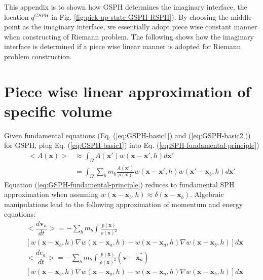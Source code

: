  \label{app:determine-imag-int} 
This appendix is to shown how GSPH determines the imaginary interface, the location $q^{GSPH}$ in Fig. \ref{fig:pick-up-state-GSPH-RSPH}). By choosing the middle point as the imaginary interface, we essentially adopt piece wise constant manner when constructing of Riemann problem. The following shows how the imaginary interface is determined if a piece wise linear manner is adopted for Riemann problem construction.

\section{Piece wise linear approximation of specific volume}
Given fundamental equations (Eq. (\ref{eq:GSPH-basic1}) and (\ref{eq:GSPH-basic2})) for GSPH, plug Eq. (\ref{eq:GSPH-basic1}) into Eq. (\ref{eq:SPH-fundamental-principle})
\begin{equation}
\begin{split}
<A\left(\textbf{x}\right)> 
& \approx \int_{\Omega} A\left(\textbf{x} \prime\right) w\left(\textbf{x}-\textbf{x}\prime, h\right) d\textbf{x}\prime \\
& = \int_{\Omega}  \sum_{b} m_{b} \frac{A\left(\textbf{x} \prime\right)}{\rho(\textbf{x})} w\left(\textbf{x}-\textbf{x}\prime, h\right) w(\textbf{x}\prime - \textbf{x}_{b}, h) d\textbf{x}\prime
\end{split}
\label{eq:GSPH-fundamental-principle}
\end{equation}
Equation (\ref{eq:GSPH-fundamental-principle}) reduces to fundamental SPH approximation when assuming $w(\textbf{x} - \textbf{x}_{b}, h) \approx \delta (\textbf{x} - \textbf{x}_{b})$. 
Algebraic manipulations \citep{inutsuka2002reformulation,iwasaki2011smoothed} lead to the following approximation of momentum and energy equations:
\begin{equation}
\begin{split}
&<\dfrac{d \textbf{v}_{a}}{dt}> =-\sum_{b} m_{b} \int \frac{p(\textbf{x})}{\rho(\textbf{x})^2} \\
&\left[w(\textbf{x} - \textbf{x}_b, h) \nabla w(\textbf{x} - \textbf{x}_a, h) - w(\textbf{x} - \textbf{x}_a, h) \nabla w(\textbf{x} - \textbf{x}_b, h)\right] d\textbf{x} 
\end{split}
\label{eq:gov-gsph-v-approx}
\end{equation}
\begin{equation}
\begin{split}
&<\dfrac{d e_{a}}{dt}> =-\sum_{b} m_{b} \int \frac{p(\textbf{x})}{\rho(\textbf{x})^2} (\textbf{v} - \dot{\textbf{x}}_{a}^{\ast})\\
&\left[ w(\textbf{x}- \textbf{x}_b, h) \nabla w(\textbf{x} - \textbf{x}_a, h) - w(\textbf{x} - \textbf{x}_a, h) \nabla w(\textbf{x} - \textbf{x}_b, h) \right] d\textbf{x} 
\end{split}
\label{eq:gov-gsph-e--approx}
\end{equation}
